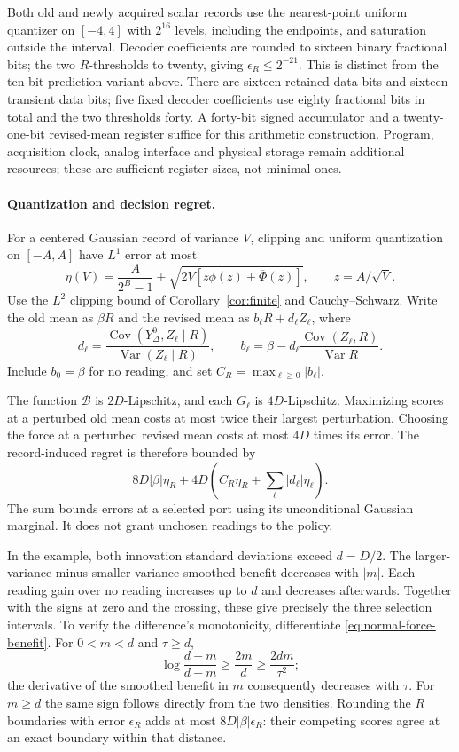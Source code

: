 \documentclass[12pt,a4paper]{article}
\newcommand{\Var}{\operatorname{Var}}
\begin{document}
Both old and newly acquired scalar records use the nearest-point uniform
quantizer on $[-4,4]$ with $2^{16}$ levels, including the endpoints, and
saturation outside the interval. Decoder coefficients are rounded to
sixteen binary fractional bits; the two $R$-thresholds to twenty, giving
$\epsilon_R\le 2^{-21}$. This is distinct from the ten-bit prediction
variant above.
There are sixteen retained data bits and sixteen transient data bits;
five fixed decoder coefficients use eighty fractional bits in total
and the two thresholds forty. A forty-bit signed accumulator and a
twenty-one-bit revised-mean register suffice for this arithmetic
construction. Program, acquisition clock, analog interface and
physical storage remain additional resources; these are sufficient
register sizes, not minimal ones.


\paragraph{Quantization and decision regret.}
For a centered Gaussian record of variance $V$, clipping and uniform
quantization on $[-A,A]$ have $L^1$ error at most
\[
 \eta(V)=\frac{A}{2^B-1}
 +\sqrt{2V[z\phi(z)+\overline\Phi(z)]},\qquad z=A/\sqrt V.
\]
Use the $L^2$ clipping bound of Corollary~\ref{cor:finite} and
Cauchy--Schwarz. Write the old mean as $\beta R$ and the revised
mean as $b_\ell R+d_\ell Z_\ell$, where
\[
 d_\ell=\frac{\operatorname{Cov}(Y_\Delta^0,Z_\ell\mid R)}
 {\Var(Z_\ell\mid R)},\qquad
 b_\ell=\beta-d_\ell\frac{\operatorname{Cov}(Z_\ell,R)}{\Var R}.
\]
Include $b_0=\beta$ for no reading, and set $C_R=\max_{\ell\geq0}|b_\ell|$.

The function $\mathcal B$ is $2D$-Lipschitz, and each $G_\ell$ is
$4D$-Lipschitz. Maximizing scores at a perturbed old mean costs at
most twice their largest perturbation. Choosing the force at a
perturbed revised mean costs at most $4D$ times its error.
The record-induced regret is therefore bounded by
\[
 8D|\beta|\eta_R+
 4D\left(C_R\eta_R+\sum_\ell|d_\ell|\eta_\ell\right).
\]
The sum bounds errors at a selected port using its unconditional
Gaussian marginal. It does not grant unchosen readings to the policy.

In the example, both innovation standard deviations exceed $d=D/2$.
The larger-variance minus smaller-variance smoothed benefit decreases
with $|m|$. Each reading gain over no reading increases up to $d$
and decreases afterwards. Together with the signs at zero and the
crossing, these give precisely the three selection intervals.
To verify the difference's monotonicity, differentiate
\eqref{eq:normal-force-benefit}. For $0<m<d$ and $\tau\geq d$,
\[
 \log\frac{d+m}{d-m}\geq\frac{2m}{d}
 \geq\frac{2dm}{\tau^2};
\]
the derivative of the smoothed benefit in $m$ consequently decreases
with $\tau$. For $m\geq d$ the same sign follows directly from the
two densities. Rounding the $R$ boundaries with error $\epsilon_R$
adds at most $8D|\beta|\epsilon_R$: their competing scores agree
at an exact boundary within that distance.
\end{document}
